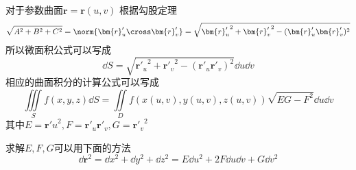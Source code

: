 对于参数曲面$\bm{r} = \bm{r}(u,v)$
根据勾股定理
\[ \sqrt{A^2+B^2+C^2} = \norm{\bm{r}'_u\cross\bm{r}'_v} = \sqrt{{\bm{r}'_u}^2 + {\bm{r}'_v}^2 - (\bm{r}'_u\bm{r}'_v)^2} \]
所以微面积公式可以写成
\[ \dd{S} = \sqrt{{\bm{r}'_u}^2 + {\bm{r}'_v}^2 - (\bm{r}'_u\bm{r}'_v)^2} \dd{u}\dd{v} \]
相应的曲面积分的计算公式可以写成
\begin{equation}
    \iiint\limits_S f(x,y,z)\dd{S} = \iint\limits_D f(x(u,v),y(u,v),z(u,v))\sqrt{EG-F^2}\dd{u}\dd{v}
\end{equation}
其中$E = {\bm{r}'u}^2, F=\bm{r}'_u\bm{r}'_v, G={\bm{r}'_v}^2$

求解$E,F,G$可以用下面的方法
\begin{equation}
    \dd{\bm{r}^2} = \dd{x^2} + \dd{y^2} + \dd{z^2} =E\dd{u^2}+2F\dd{u}\dd{v}+G\dd{v^2}
\end{equation}


